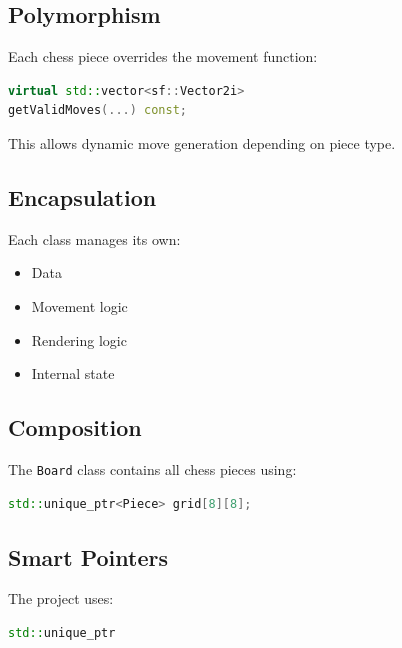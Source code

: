 \documentclass[11pt]{article}
\begin{document}

\subsection{Polymorphism}

Each chess piece overrides the movement function:

\begin{lstlisting}[language=C++]
virtual std::vector<sf::Vector2i>
getValidMoves(...) const;
\end{lstlisting}

This allows dynamic move generation depending on piece type.


\subsection{Encapsulation}

Each class manages its own:

\begin{itemize}
    \item Data
    \item Movement logic
    \item Rendering logic
    \item Internal state
\end{itemize}


\subsection{Composition}

The \texttt{Board} class contains all chess pieces using:

\begin{lstlisting}[language=C++]
std::unique_ptr<Piece> grid[8][8];
\end{lstlisting}


\subsection{Smart Pointers}

The project uses:

\begin{lstlisting}[language=C++]
std::unique_ptr
\end{lstlisting}
\end{document}
